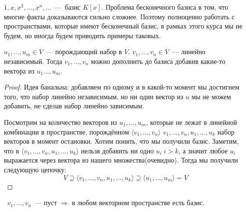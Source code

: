 \begin{example}
    $1, x, x^2, \dots, x^n, \dots$~---~базис $K[x]$. 
    Проблема бесконечного базиса в том, что многие факты доказываются сильно сложнее.
    Поэтому полноценно работать с пространствами, которые имеют бесконечный базис, в рамках этого
    курса мы не будем, но иногда будем приводить примеры таковых.
\end{example}
\begin{theorem}
    $u_1,\dots,u_m\in V$~--- порождающий набор в $V$. $v_1,\dots,v_n\in V$~---
    линейно независимый. Тогда $v_1,\dots, v_n$ можно дополнить до базиса добавив
    какие-то вектора из $u_1\dots, u_m$.
\end{theorem}
\begin{proof}
Идея банальна: добавляем по одному и в какой-то момент мы достигнем того, что набор
линейно независимым, но ни один вектор из $u$ мы не можем добавить, не сделав набор
линейно зависимым.

Посмотрим на количество векторов из $u_1,\dots, u_m$, которые не
лежат в линейной комбинации в пространстве, порождённом $\langle  v_1,\dots, v_n\rangle$
$v_1,\dots,v_n, u_1,\dots, u_k$ набор векторов в момент остановки. Хотим понять, что
мы получили базис.
Заметим, что в $\langle v_1,\dots,v_n,u_1,\dots,u_k\rangle$ нельзя добавить ни одно $u_i\; i > k$, а значит
любое $u_i$ выражается через вектора из нашего множества(очевидно). Тогда мы получили
следующую цепочку:
$$V\supseteq \langle v_1,\dots,v_n, u_1,\dots,u_k\rangle \supseteq \langle u_1,\dots,u_m\rangle=V$$
\end{proof}
\follow~$v_1,\dots,v_n$~--- пуст $\Rightarrow$ в любом векторном пространстве есть базис.
